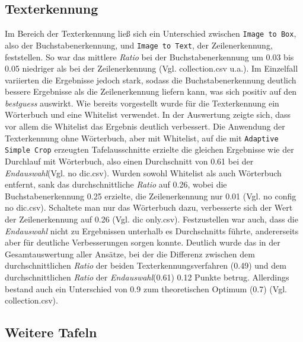 \subsection{Texterkennung}
Im Bereich der Texterkennung ließ sich ein Unterschied zwischen \verb|Image to Box|, also der Buchstabenerkennung, und \verb|Image to Text|, der Zeilenerkennung, feststellen. So war das mittlere \textit{Ratio} bei der Buchstabenerkennung um 0.03 bis 0.05 niedriger als bei der Zeilenerkennung (Vgl. collection.csv u.a.). Im Einzelfall variierten die Ergebnisse jedoch stark, sodass die Buchstabenerkennung deutlich bessere Ergebnisse als die Zeilenerkennung liefern kann, was sich positiv auf den \textit{bestguess} auswirkt.
Wie bereits vorgestellt wurde für die Texterkennung ein Wörterbuch und eine Whitelist verwendet. In der Auswertung zeigte sich, dass vor allem die Whitelist das Ergebnis deutlich verbessert. Die Anwendung der Texterkennung ohne Wörterbuch, aber mit Whitelist, auf die mit \verb|Adaptive Simple Crop| erzeugten Tafelausschnitte erzielte die gleichen Ergebnisse wie der Durchlauf mit Wörterbuch, also einen Durchschnitt von 0.61 bei der \textit{Endauswahl}(Vgl. no dic.csv). Wurden sowohl Whitelist als auch Wörterbuch entfernt, sank das durchschnittliche \textit{Ratio} auf 0.26, wobei die Buchstabenerkennung 0.25 erzielte, die Zeilenerkennung nur 0.01 (Vgl. no config no dic.csv). Schaltete man nur das Wörterbuch dazu, verbesserte sich der Wert der Zeilenerkennung auf 0.26 (Vgl. dic only.csv).
Festzustellen war auch, dass die \textit{Endauswahl} nicht zu Ergebnissen unterhalb es Durchschnitts führte, andererseits aber für deutliche Verbesserungen sorgen konnte. Deutlich wurde das in der Gesamtauswertung aller Ansätze, bei der die Differenz zwischen dem durchschnittlichen \textit{Ratio} der beiden Texterkennungsverfahren (0.49) und dem durchschnittlichen \textit{Ratio} der \textit{Endauswahl}(0.61) 0.12 Punkte betrug. Allerdings bestand auch ein Unterschied von 0.9 zum theoretischen Optimum (0.7) (Vgl. collection.csv).


\subsection{Weitere Tafeln}

